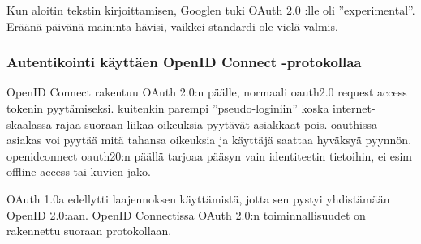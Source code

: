 \documentclass[finnish,gradu]{tktltiki}
\begin{document}
  Kun aloitin tekstin kirjoittamisen, Googlen tuki OAuth 2.0 :lle oli ''experimental''. Eräänä päivänä maininta hävisi, vaikkei standardi ole vielä valmis. %





  \subsubsection{Autentikointi käyttäen OpenID Connect -protokollaa} %
  \label{ssub:autentikointi_käyttäen_openid_connect_protokollaa}

  OpenID Connect rakentuu OAuth 2.0:n päälle, normaali oauth2.0 request access tokenin pyytämiseksi. kuitenkin parempi ''pseudo-loginiin'' koska internet-skaalassa rajaa suoraan liikaa oikeuksia pyytävät asiakkaat pois. oauthissa asiakas voi pyytää mitä tahansa oikeuksia ja käyttäjä saattaa hyväksyä pyynnön. openidconnect oauth20:n päällä tarjoaa pääsyn vain identiteetin tietoihin, ei esim offline access tai kuvien jako.

  OAuth 1.0a edellytti laajennoksen käyttämistä, jotta sen pystyi yhdistämään OpenID 2.0:aan. OpenID Connectissa OAuth 2.0:n toiminnallisuudet on rakennettu suoraan protokollaan.





\end{document}
